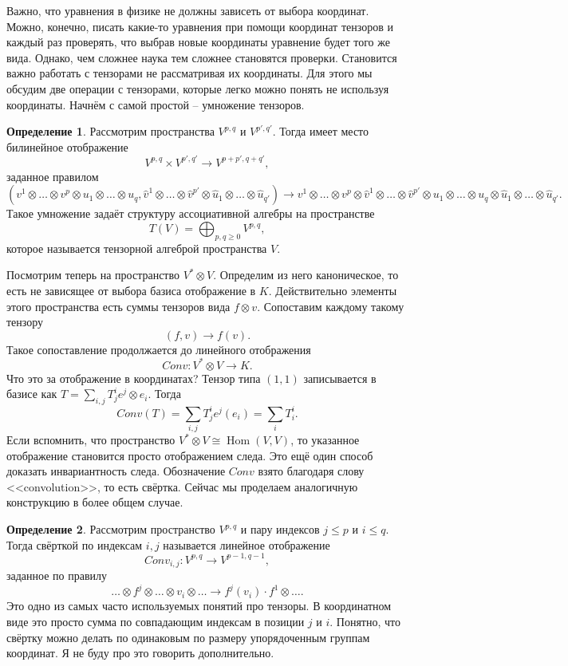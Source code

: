 \documentclass[10pt,a4paper,oneside]{book}
\theoremstyle{definition}
\newtheorem*{defn}{{\color{yellow!30!red} Определение}}
\newcommand{\Hom}{\operatorname{Hom}}
\def\dfn{\begin{defn}}
\def\edfn{\end{defn}}
\begin{document}
Важно, что уравнения в физике не должны зависеть от выбора координат. Можно, конечно, писать какие-то уравнения при помощи координат тензоров и каждый раз проверять, что выбрав новые координаты уравнение будет того же вида. Однако, чем сложнее наука тем сложнее становятся проверки. Становится важно работать с тензорами не рассматривая их координаты. Для этого мы обсудим две операции с тензорами, которые легко можно понять не используя координаты. Начнём с самой простой -- умножение тензоров.

\dfn Рассмотрим пространства $V^{p,q}$ и $V^{p',q'}$. Тогда имеет место билинейное отображение $$V^{p,q}\times V^{p',q'} \to V^{p+p',q+q'},$$
заданное правилом 
$$(v^1\otimes\dots\otimes v^p\otimes u_1\otimes\dots \otimes u_q,\hat{v}^1\otimes\dots\otimes \hat{v}^{p'}\otimes \hat{u}_1\otimes\dots \otimes \hat{u}_{q'}) \to v^1\otimes\dots\otimes v^p\otimes \hat{v}^1\otimes\dots\otimes \hat{v}^{p'}\otimes u_1\otimes\dots \otimes u_q \otimes \hat{u}_1\otimes\dots \otimes \hat{u}_{q'}.$$
Такое умножение задаёт структуру ассоциативной алгебры на пространстве 
$$T(V)=\bigoplus_{p,q\geq 0} V^{p,q},$$
которое называется тензорной алгеброй пространства $V$.
\edfn

Посмотрим теперь на пространство $V^*\otimes V$. Определим из него каноническое, то есть не зависящее от выбора базиса отображение в $K$. Действительно элементы этого пространства есть суммы тензоров вида $f\otimes v$. Сопоставим каждому такому тензору 
$$(f,v) \to f(v).$$
Такое сопоставление продолжается до линейного отображения $$Conv \colon V^*\otimes V \to K.$$
Что это за отображение в координатах? Тензор типа $(1,1)$ записывается в базисе как $T=\sum_{i,j} T_j^i e^j\otimes e_i$. Тогда $$Conv(T)=\sum_{i,j} T_j^i e^j(e_i)=\sum_i T^i_i.$$
Если вспомнить, что пространство $V^*\otimes V \cong \Hom(V,V)$, то указанное отображение становится просто отображением следа. Это ещё один способ доказать инвариантность следа. Обозначение $Conv$ взято благодаря слову <<convolution>>, то есть свёртка. Сейчас мы проделаем аналогичную конструкцию в более общем случае. 

\dfn Рассмотрим пространство $V^{p,q}$ и пару индексов $j\leq p$ и $i\leq q$. Тогда свёрткой по индексам $i,j$ называется линейное отображение 
$$Conv_{i,j} \colon V^{p,q}\to V^{p-1,q-1},$$
заданное по правилу 
$$ \dots \otimes f^j\otimes \dots \otimes v_i \otimes \dots \to f^j(v_i)\cdot f^1\otimes \dots.$$
Это одно из самых часто используемых понятий про тензоры. В координатном виде это просто сумма по совпадающим индексам в позиции $j$ и $i$. Понятно, что свёртку можно делать по одинаковым по размеру упорядоченным группам координат. Я не буду про это говорить дополнительно.
\edfn
\end{document}
